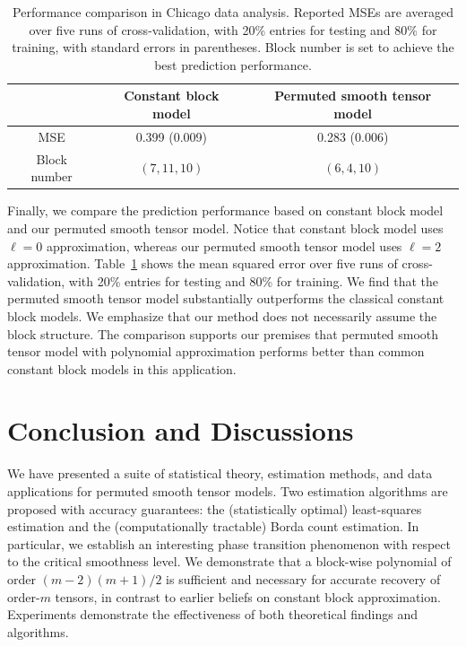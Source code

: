 \documentclass[12pt]{article}
\theoremstyle{definition}
\begin{document}
\begin{table}[htp!]
    \centering
    \begin{tabular}{c|c|c}
         &  Constant block model & Permuted smooth tensor model \\\hline
         
        MSE &   0.399 (0.009) &  0.283 (0.006)\\
        Block number &    $(7,11,10)$  & $(6,4,10)$
    \end{tabular}
    \caption{Performance comparison in Chicago data analysis. Reported MSEs are averaged
over five runs of cross-validation, with 20\% entries for testing and 80\% for training, with standard
errors in parentheses. Block number is set to achieve the best prediction performance.}\label{tab:MSE}
\end{table}

Finally, we compare the prediction performance based on constant block model and our permuted smooth tensor model. Notice that constant block model uses $\ell=0$ approximation, whereas our permuted smooth tensor model uses $\ell=2$ approximation. Table~\ref{tab:MSE} shows the mean squared error over five runs of cross-validation, with 20\% entries for testing and 80\% for training. We find that the permuted smooth tensor model substantially outperforms the classical constant block models. We emphasize that our method does not necessarily assume the block structure. The comparison supports our premises that permuted smooth tensor model with polynomial approximation performs better than common constant block models in this application. 


\section{Conclusion and Discussions}\label{sec:discussion}
We have presented a suite of statistical theory, estimation methods, and data applications for permuted smooth tensor models. Two estimation algorithms are proposed with accuracy guarantees: the (statistically optimal) least-squares estimation and the (computationally tractable) Borda count estimation. In particular, we establish an interesting phase transition phenomenon with respect to the critical smoothness level. We demonstrate that a block-wise polynomial of order $(m-2)(m+1)/2$ is sufficient and necessary for accurate recovery of order-$m$ tensors, in contrast to earlier beliefs on constant block approximation. Experiments demonstrate the effectiveness of both theoretical findings and algorithms. 
\end{document}
